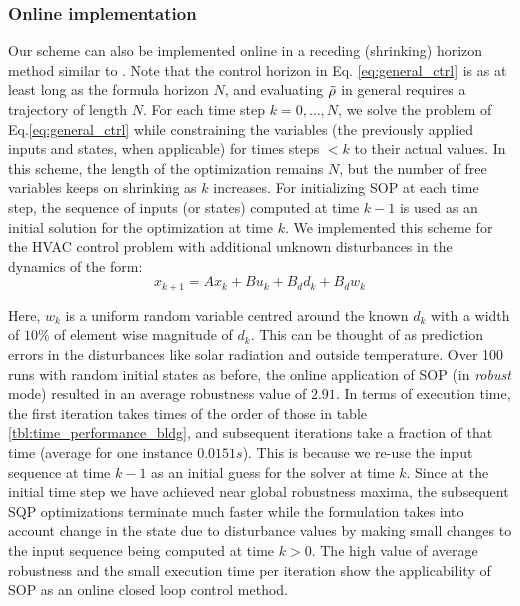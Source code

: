 \subsubsection{Online implementation} 
Our scheme can also be implemented online in a receding (shrinking) horizon method similar to \cite{Raman14_MPCSTL}. Note that the control horizon in Eq. \ref{eq:general_ctrl} is as at least long as the formula horizon $N$, and evaluating $\tilde{\rho}$ in general requires a trajectory of length $N$. 
For each time step $k=0,\dotsc,N$, we solve the problem of Eq.\ref{eq:general_ctrl} while constraining the variables (the previously applied inputs and states, when applicable) for times steps $<k$ to their actual values. In this scheme, the length of the optimization remains $N$, but the number of free variables keeps on shrinking as $k$ increases. For initializing SOP at each time step, the sequence of inputs (or states) computed at time $k-1$ is used as an initial solution for the optimization at time $k$. 
We implemented this scheme for the HVAC control problem with additional unknown disturbances in the dynamics of the form:
$$x_{k+1} = Ax_{k}+Bu_k+B_dd_k+B_dw_k$$

Here, $w_k$ is a uniform random variable centred around the known $d_k$ with a width of $10\%$ of element wise magnitude of $d_k$. This can be thought of as prediction errors in the disturbances like solar radiation and outside temperature. Over 100 runs with random initial states as before, the online application of SOP (in \textit{robust} mode) resulted in an average robustness value of $2.91$. In terms of execution time, the first iteration takes times of the order of those in table \ref{tbl:time_performance_bldg}, and subsequent iterations take a fraction of that time (average for one instance $0.0151s$). This is because we re-use the input sequence at time $k-1$ as an initial guess for the solver at time $k$. Since at the initial time step we have achieved near global robustness maxima, the subsequent SQP optimizations terminate much faster while the formulation takes into account change in the state due to disturbance values by making small changes to the input sequence being computed at time $k>0$. The high value of average robustness and the small execution time per iteration show the applicability of SOP as an online closed loop control method. 

